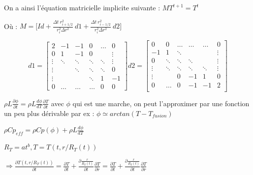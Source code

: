 \documentclass[10pt,a4paper]{article}
\numberwithin{equation}{section}
\begin{document}
On a ainsi l'équation matricielle implicite suivante : $ MT^{t+1} = T^t $


Où :
$
M = \Big [ Id + \frac{\Delta t ~ r^2_{i+1/2}}{r^2_i \Delta r^2} ~ d1 + \frac{\Delta t ~ r^2_{i-1/2}}{r^2_i \Delta r^2} ~ d2  \Big]
$

\begin{equation}
d1=
\begin{bmatrix}
    2      & -1     & -1        & 0     &\dots      & 0 \\
    0      &  1     & -1        & 0     &           & \vdots  \\
    \vdots & \ddots & \ddots    &\ddots & \ddots    & \vdots \\
    \vdots &        & \ddots    &\ddots & \ddots    & 0 \\
    \vdots &        &           &\ddots & 1         &  -1 \\
    0      & \dots  & \dots     &\dots  & 0         &  0
\end{bmatrix}
d2=
\begin{bmatrix}
     0     & 0      & \dots  & \dots    &\dots      & 0 \\
    -1     & 1      & \ddots &          &           & \vdots  \\
    0      & \ddots & \ddots & \ddots   &           & \vdots \\
    \vdots & \ddots & \ddots & \ddots   & \ddots    & \vdots \\
    \vdots &        & 0      &  -1      &  1        & 0\\
    0      & \dots  & 0      &  -1      & -1        & 2 \\
\end{bmatrix}
\end{equation}

$ \rho L \frac{\partial \phi}{\partial t} = \rho L \frac{d \phi}{d T}\frac{\partial T}{\partial t} $ avec $\phi$ qui est une marche, on peut l'approximer par une fonction un peu plus dérivable par ex :  $\phi \simeq arctan(T-T_{fusion})$ 

$ \rho Cp_{eff} = \rho Cp(\phi) + \rho L  \frac{d \phi}{d T}$



$R_T = a t^b , T = T(t,r/R_T(t)) $

$\Rightarrow \frac{\partial T(t,r/R_T(t))}{\partial t}  = \frac{\partial T}{\partial t} + \frac{\partial \frac{r}{R_T(t)}}{\partial t}\frac{\partial T}{\partial r} = \frac{\partial T}{\partial t} + \frac{\partial \frac{r}{R_T(t)}}{\partial t}\frac{\partial T}{\partial r} $
\end{document}
